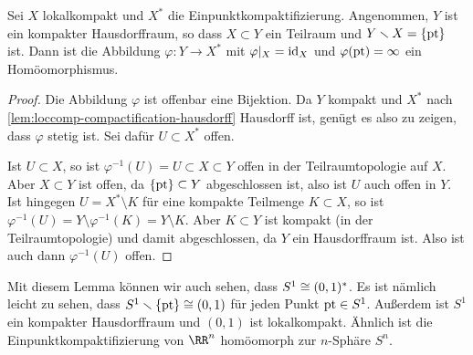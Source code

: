 \begin{lemma}
Sei $X$ lokalkompakt und $X^*$ die Einpunktkompaktifizierung. Angenommen, $Y$ ist ein kompakter Hausdorffraum, so dass $X\subset Y$ ein Teilraum und $Y\setminus X = \{\pt\}$ ist. Dann ist die Abbildung $\varphi\colon Y\to X^*$ mit $\varphi|_X = \operatorname{\textnormal{id}}_X$ und $\varphi(\operatorname{\textnormal{pt}}) = \infty$ ein Homöomorphismus.
\end{lemma}
\begin{proof}
Die Abbildung $\varphi$ ist offenbar eine Bijektion. Da $Y$ kompakt und $X^*$ nach \autoref{lem:loccomp-compactification-hausdorff} Hausdorff ist, genügt es also zu zeigen, dass $\varphi$ stetig ist. Sei dafür $U\subset X^*$ offen.

Ist $U\subset X$, so ist $\varphi^{-1}(U) = U\subset X\subset Y$ offen in der Teilraumtopologie auf $X$. Aber $X\subset Y$ ist offen, da $\{\pt\}\subset Y$ abgeschlossen ist, also ist $U$ auch offen in $Y$. Ist hingegen $U = X^*\setminus K$ für eine kompakte Teilmenge $K\subset X$, so ist $\varphi^{-1}(U) = Y\setminus \varphi^{-1}(K) = Y\setminus K$. Aber $K\subset Y$ ist kompakt (in der Teilraumtopologie) und damit abgeschlossen, da $Y$ ein Hausdorffraum ist. Also ist auch dann $\varphi^{-1}(U)$ offen.
\end{proof}

Mit diesem Lemma können wir auch sehen, dass $S^1\cong (0,1)^*$. Es ist nämlich leicht zu sehen, dass $S^1\setminus\{\pt\}\isom (0,1)$ für jeden Punkt $\operatorname{\textnormal{pt}}\in S^1$. Außerdem ist $S^1$ ein kompakter Hausdorffraum und $(0,1)$ ist lokalkompakt. Ähnlich ist die Einpunktkompaktifizierung von $\RR^n$ homöomorph zur $n$-Sphäre $S^n$.

